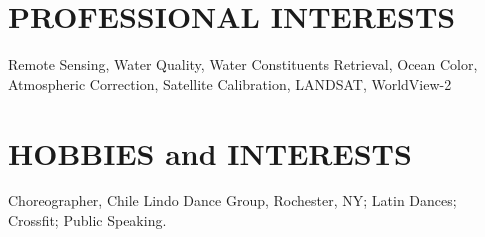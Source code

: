 \documentclass[11pt]{res} %
\begin{document}
\begin{resume}
\vspace{-0.1in}
\section{PROFESSIONAL INTERESTS}
\vspace{0.1in}
Remote Sensing, Water Quality, Water Constituents Retrieval, Ocean Color, Atmospheric Correction, Satellite Calibration, LANDSAT, WorldView-2\\

\vspace{-0.1in}
\section{HOBBIES and INTERESTS}
\vspace{0.1in}
Choreographer, Chile Lindo Dance Group, Rochester, NY; Latin Dances; Crossfit; Public Speaking. \\

\end{resume}
\end{document}
